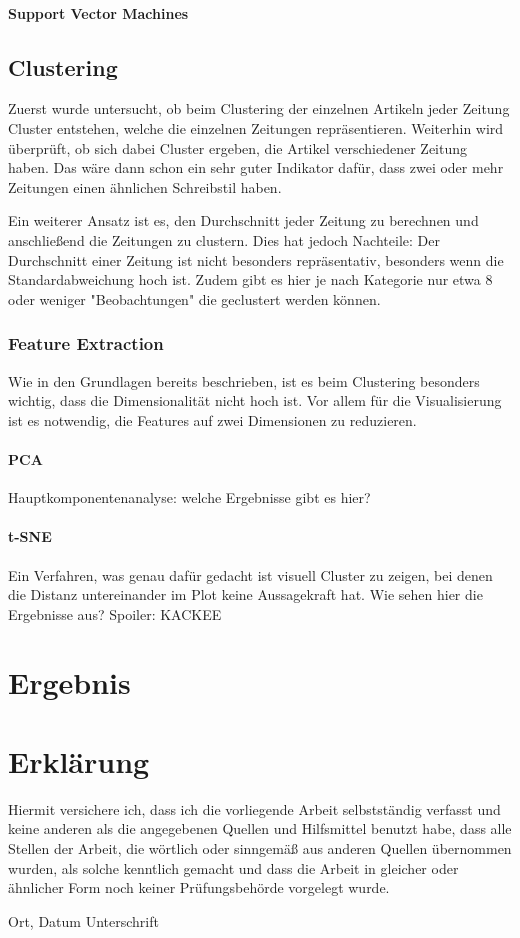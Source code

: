 \subsubsection*{Support Vector Machines}
\section{Clustering}
Zuerst wurde untersucht, ob beim Clustering der einzelnen Artikeln jeder Zeitung Cluster entstehen, welche die einzelnen Zeitungen repräsentieren. Weiterhin wird überprüft, ob sich dabei Cluster ergeben, die Artikel verschiedener Zeitung haben. Das wäre dann schon ein sehr guter Indikator dafür, dass zwei oder mehr Zeitungen einen ähnlichen Schreibstil haben.

Ein weiterer Ansatz ist es, den Durchschnitt jeder Zeitung zu berechnen und anschließend die Zeitungen zu clustern. Dies hat jedoch Nachteile: Der Durchschnitt einer Zeitung ist nicht besonders repräsentativ, besonders wenn die Standardabweichung hoch ist. Zudem gibt es hier je nach Kategorie nur etwa 8 oder weniger "Beobachtungen" die geclustert werden können.
\subsection{Feature Extraction}
Wie in den Grundlagen bereits beschrieben, ist es beim Clustering besonders wichtig, dass die Dimensionalität nicht hoch ist. Vor allem für die Visualisierung ist es notwendig, die Features auf zwei Dimensionen zu reduzieren.
\subsubsection*{PCA}
Hauptkomponentenanalyse: welche Ergebnisse gibt es hier?
\subsubsection*{t-SNE}
Ein Verfahren, was genau dafür gedacht ist visuell Cluster zu zeigen, bei denen die Distanz untereinander im Plot keine Aussagekraft hat. Wie sehen hier die Ergebnisse aus? Spoiler: KACKEE

\chapter{Ergebnis}




\chapter*{Erklärung}

Hiermit versichere ich, dass ich die vorliegende Arbeit selbstständig verfasst und keine anderen als die angegebenen Quellen und Hilfsmittel benutzt habe, dass alle Stellen der Arbeit, die wörtlich oder sinngemäß aus anderen Quellen übernommen wurden, als solche kenntlich gemacht und dass die Arbeit in gleicher oder ähnlicher Form noch keiner Prüfungsbehörde vorgelegt wurde.

\vspace{3cm}
Ort, Datum \hspace{5cm} Unterschrift\\

